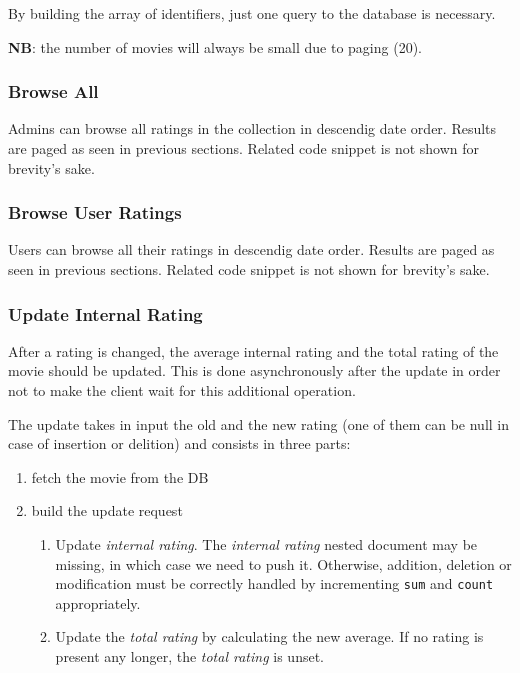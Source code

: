 \documentclass[11pt]{article}
\begin{document}
By building the array of identifiers, just one query to the database is necessary.

\textbf{NB}: the number of movies will always be small due to paging (20).



\subsubsection{Browse All}
Admins can browse all ratings in the collection in descendig date order. Results are paged as seen in previous sections. Related code snippet is not shown for brevity's sake.

\subsubsection{Browse User Ratings}
Users can browse all their ratings in descendig date order. Results are paged as seen in previous sections. Related code snippet is not shown for brevity's sake.

\subsubsection{Update Internal Rating}
\label{sssec:updateInternalRating}
After a rating is changed, the average internal rating and the total rating of the movie should be updated. This is done asynchronously after the update in order not to make the client wait for this additional operation.

The update takes in input the old and the new rating (one of them can be null in case of insertion or delition) and consists in three parts:
\begin{enumerate}
	\item fetch the movie from the DB
	\item build the update request
	\begin{enumerate}
		\item Update \emph{internal rating}. The \emph{internal rating} nested document may be missing, in which case we need to push it. Otherwise, addition, deletion or modification must be correctly handled by incrementing \texttt{sum} and \texttt{count} appropriately.
		\item Update the \emph{total rating} by calculating the new average. If no rating is present any longer, the \emph{total rating} is unset.
	\end{enumerate}
\end{enumerate}
\end{document}
